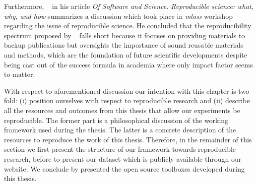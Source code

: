Furthermore, \citeauthor{varoquaux2015Software}~\cite{varoquaux2015Software} in his article %
\emph{Of Software and Science. Reproducible science: what, why, and how} summarizes a discussion which took place in \emph{\acs{mloss}} workshop regarding the issue of reproducible science.
He concluded that the reproducibility spectrum proposed by \citeauthor{peng2011reproducible}~\cite{peng2011reproducible} falls short because it focuses on providing materials to backup publications but oversights the importance of sound reusable materials and methods, which are the foundation of future scientific developments despite being cast out of the success formula in academia where only impact factor seems to matter.

With respect to aforementioned discussion our intention with this chapter is two fold: (i) position ourselves with respect to reproducible research and (ii) describe all the resources and outcomes from this thesis that allow our experiments be reproducible.
The former part is a philosophical discussion of the working framework used during the thesis. 
The latter is a concrete description of the resources to reproduce the work of this thesis.
Therefore, in the remainder of this section we first present the structure of our framework towards reproducible research, before to present our dataset which is publicly available through our website.
We conclude by presented the open source toolboxes developed during this thesis.

